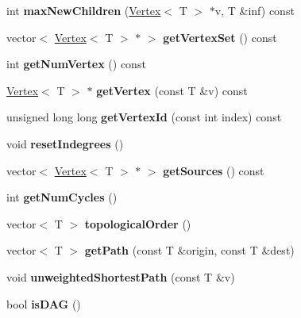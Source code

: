 \begin{DoxyCompactItemize}
int {\bfseries max\+New\+Children} (\hyperlink{class_vertex}{Vertex}$<$ T $>$ $\ast$v, T \&inf) const
\item 
\hypertarget{class_graph_a923b43995f81ad9319bbc81a1e433e64}{}\label{class_graph_a923b43995f81ad9319bbc81a1e433e64} 
vector$<$ \hyperlink{class_vertex}{Vertex}$<$ T $>$ $\ast$ $>$ {\bfseries get\+Vertex\+Set} () const
\item 
\hypertarget{class_graph_a0853eac15cdf0f06d63f4b8a7820ec71}{}\label{class_graph_a0853eac15cdf0f06d63f4b8a7820ec71} 
int {\bfseries get\+Num\+Vertex} () const
\item 
\hypertarget{class_graph_a67453d232f04e85c642b51554df1bc6a}{}\label{class_graph_a67453d232f04e85c642b51554df1bc6a} 
\hyperlink{class_vertex}{Vertex}$<$ T $>$ $\ast$ {\bfseries get\+Vertex} (const T \&v) const
\item 
\hypertarget{class_graph_afd67e875d09bc0f256275f87d7e6cf9e}{}\label{class_graph_afd67e875d09bc0f256275f87d7e6cf9e} 
unsigned long long {\bfseries get\+Vertex\+Id} (const int index) const
\item 
\hypertarget{class_graph_af34eb86d804272e6e3e221a9ed688c53}{}\label{class_graph_af34eb86d804272e6e3e221a9ed688c53} 
void {\bfseries reset\+Indegrees} ()
\item 
\hypertarget{class_graph_a947115150a94f88ac9aedbcec59dd07e}{}\label{class_graph_a947115150a94f88ac9aedbcec59dd07e} 
vector$<$ \hyperlink{class_vertex}{Vertex}$<$ T $>$ $\ast$ $>$ {\bfseries get\+Sources} () const
\item 
\hypertarget{class_graph_a694dff81073c38b669057f0c6bd4cbb1}{}\label{class_graph_a694dff81073c38b669057f0c6bd4cbb1} 
int {\bfseries get\+Num\+Cycles} ()
\item 
\hypertarget{class_graph_a2e75512c089c3916dda9cf61e1185d9d}{}\label{class_graph_a2e75512c089c3916dda9cf61e1185d9d} 
vector$<$ T $>$ {\bfseries topological\+Order} ()
\item 
\hypertarget{class_graph_ab4054ca572c10669dd3e05d6d41c116c}{}\label{class_graph_ab4054ca572c10669dd3e05d6d41c116c} 
vector$<$ T $>$ {\bfseries get\+Path} (const T \&origin, const T \&dest)
\item 
\hypertarget{class_graph_ae5264597aacaf4f45819e96a6d6c89aa}{}\label{class_graph_ae5264597aacaf4f45819e96a6d6c89aa} 
void {\bfseries unweighted\+Shortest\+Path} (const T \&v)
\item 
\hypertarget{class_graph_ab49d07c2bd6b8b30d5ae82bc558b821a}{}\label{class_graph_ab49d07c2bd6b8b30d5ae82bc558b821a} 
bool {\bfseries is\+D\+AG} ()
\item 

\end{DoxyCompactItemize}
